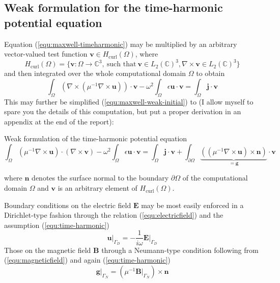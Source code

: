 \documentclass[11pt, a4paper]{article}
\begin{document}
\subsection{Weak formulation for the time-harmonic potential equation}
\label{subsec:maxwell-weak}

Equation (\ref{equ:maxwell-timeharmonic}) may be multiplied by an arbitrary
vector-valued test function $\mathbf{v} \in H_{\textrm{curl}}(\Omega)$, where
\begin{equation}
    H_{\textrm{curl}}(\Omega) = \{\mathbf{v} : \Omega \to \mathbb{C}^3,~\text{such that}~\mathbf{v}\in L_2(\mathbb{C})^3, \nabla \times \mathbf{v} \in L_2(\mathbb{C})^3\} \label{equ:h-curl}
\end{equation}
and then integrated over the whole computational domain $\Omega$ to obtain 
\begin{equation}
    \int_{\Omega} (\nabla \times ({\mu^{-1} \nabla \times \mathbf{u}})) \cdot \mathbf{v}
    - \omega^2 \int_{\Omega} \epsilon \mathbf{u} \cdot \mathbf{v} = \int_{\Omega} \mathbf{j} \cdot \mathbf{v} \label{equ:maxwell-weak-initial}
\end{equation}
This may further be simplified (\ref{equ:maxwell-weak-initial}) to (I allow myself
to spare you the details of this computation, but put a proper derivation
in an appendix at the end of the report):
\begin{fancybox}{Weak formulation of the time-harmonic potential equation}
    \begin{equation}
        \int_{\Omega} ({\mu^{-1} \nabla \times \mathbf{u}}) \cdot (\nabla \times \mathbf{v})
        - \omega^2 \int_{\Omega} \epsilon \mathbf{u} \cdot \mathbf{v} 
        = \int_{\Omega} \mathbf{j} \cdot \mathbf{v}
        + \int_{\partial \Omega} \underbrace{(({\mu^{-1} \nabla \times \mathbf{u}}) \times \mathbf{n})}_{= \mathbf{g}} \cdot \mathbf{v}
        \label{equ:maxwell-weak}
    \end{equation}
\end{fancybox}
where $\mathbf{n}$ denotes the surface normal to the boundary $\partial \Omega$
of the computational domain $\Omega$ and $\mathbf{v}$ is an arbitrary element
of $H_{\textrm{curl}}(\Omega)$.

Boundary conditions on the electric field $\mathbf{E}$ may be most easily enforced
in a Dirichlet-type fashion through the relation (\ref{equ:electricfield}) and
the assumption (\ref{equ:time-harmonic})
\begin{equation}
    \left.\mathbf{u}\right|_{\Gamma_D} = -\frac{1}{i\omega} \left.\mathbf{E}\right|_{\Gamma_D} \label{equ:dirichlet-boundary}
\end{equation}
Those on the magnetic field $\mathbf{B}$ through a Neumann-type condition following
from (\ref{equ:magneticfield}) and again (\ref{equ:time-harmonic})
\begin{equation}
    \left.\mathbf{g}\right|_{\Gamma_N} = (\mu^{-1} \left.\mathbf{B}\right|_{\Gamma_N}) \times \mathbf{n} \label{equ:neumann-boundary}
\end{equation}
\end{document}
